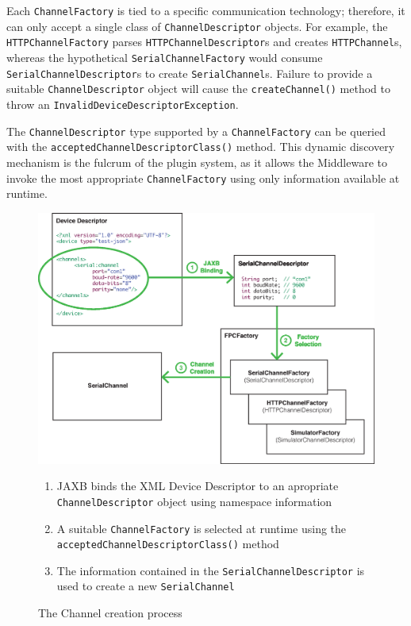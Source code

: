 Each \texttt{ChannelFactory} is tied to a specific communication technology; therefore, it can only accept a single class of \texttt{ChannelDescriptor} objects. For example, the \texttt{HTTPChannelFactory} parses \texttt{HTTPChannelDescriptor}s and creates \texttt{HTTPChannel}s, whereas the hypothetical \texttt{SerialChannelFactory} would consume \texttt{SerialChannelDescriptor}s to create \texttt{SerialChannel}s. Failure to provide a suitable \texttt{ChannelDescriptor} object will cause the \texttt{createChannel()} method to throw an \texttt{InvalidDeviceDescriptorException}.

The \texttt{ChannelDescriptor} type supported by a \texttt{ChannelFactory} can be queried with the \texttt{acceptedChannelDescriptorClass()} method. This dynamic discovery mechanism is the fulcrum of the plugin system, as it allows the Middleware to invoke the most appropriate \texttt{ChannelFactory} using only information available at runtime.

\begin{figure}[h!]
\includegraphics[width=\textwidth]{imgs/channel_creation_process.eps}
\caption{The Channel creation process}
\label{fig:channel.creation}
{
\begin{footnotesize}
\begin{enumerate}
  \item JAXB binds the XML Device Descriptor to an apropriate \texttt{ChannelDescriptor} object using namespace information
  \item A suitable \texttt{ChannelFactory} is selected at runtime using the \texttt{acceptedChannelDescriptorClass()} method
  \item The information contained in the \texttt{SerialChannelDescriptor} is used to create a new \texttt{SerialChannel}
\end{enumerate}
\end{footnotesize}
}
\end{figure}


